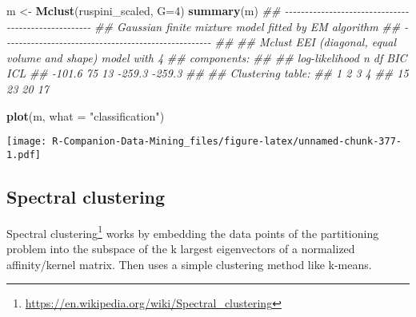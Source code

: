 \documentclass[
  notitlepage]{book}
\newenvironment{Shaded}{\begin{snugshade}}{\end{snugshade}}
\newcommand{\CommentTok}[1]{\textcolor[rgb]{0.56,0.35,0.01}{\textit{#1}}}
\newcommand{\DataTypeTok}[1]{\textcolor[rgb]{0.13,0.29,0.53}{#1}}
\newcommand{\DecValTok}[1]{\textcolor[rgb]{0.00,0.00,0.81}{#1}}
\newcommand{\KeywordTok}[1]{\textcolor[rgb]{0.13,0.29,0.53}{\textbf{#1}}}
\newcommand{\NormalTok}[1]{#1}
\newcommand{\StringTok}[1]{\textcolor[rgb]{0.31,0.60,0.02}{#1}}
\DeclareRobustCommand{\href}[2]{#2\footnote{\url{#1}}}
\begin{document}
\begin{Shaded}
\begin{Highlighting}[]
\NormalTok{m \textless{}{-}}\StringTok{ }\KeywordTok{Mclust}\NormalTok{(ruspini\_scaled, }\DataTypeTok{G=}\DecValTok{4}\NormalTok{)}
\KeywordTok{summary}\NormalTok{(m)}
\CommentTok{\#\# {-}{-}{-}{-}{-}{-}{-}{-}{-}{-}{-}{-}{-}{-}{-}{-}{-}{-}{-}{-}{-}{-}{-}{-}{-}{-}{-}{-}{-}{-}{-}{-}{-}{-}{-}{-}{-}{-}{-}{-}{-}{-}{-}{-}{-}{-}{-}{-}{-}{-}{-}{-} }
\CommentTok{\#\# Gaussian finite mixture model fitted by EM algorithm }
\CommentTok{\#\# {-}{-}{-}{-}{-}{-}{-}{-}{-}{-}{-}{-}{-}{-}{-}{-}{-}{-}{-}{-}{-}{-}{-}{-}{-}{-}{-}{-}{-}{-}{-}{-}{-}{-}{-}{-}{-}{-}{-}{-}{-}{-}{-}{-}{-}{-}{-}{-}{-}{-}{-}{-} }
\CommentTok{\#\# }
\CommentTok{\#\# Mclust EEI (diagonal, equal volume and shape) model with 4}
\CommentTok{\#\# components: }
\CommentTok{\#\# }
\CommentTok{\#\#  log{-}likelihood  n df    BIC    ICL}
\CommentTok{\#\#          {-}101.6 75 13 {-}259.3 {-}259.3}
\CommentTok{\#\# }
\CommentTok{\#\# Clustering table:}
\CommentTok{\#\#  1  2  3  4 }
\CommentTok{\#\# 15 23 20 17}
\end{Highlighting}
\end{Shaded}

\begin{Shaded}
\begin{Highlighting}[]
\KeywordTok{plot}\NormalTok{(m, }\DataTypeTok{what =} \StringTok{"classification"}\NormalTok{)}
\end{Highlighting}
\end{Shaded}

\texttt{[image: R-Companion-Data-Mining\_files/figure-latex/unnamed-chunk-377-1.pdf]}

\hypertarget{spectral-clustering}{%
\subsection{Spectral clustering}\label{spectral-clustering}}

\href{https://en.wikipedia.org/wiki/Spectral_clustering}{Spectral clustering}
works by embedding the data points of the partitioning problem into the
subspace of the k largest eigenvectors of a normalized affinity/kernel
matrix. Then uses a simple clustering method like k-means.
\end{document}
